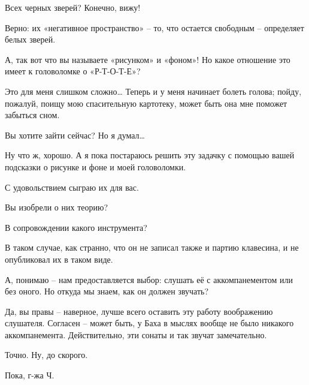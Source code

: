 \documentclass[../main.tex]{subfiles}
\begin{document}
\begin{Dialogue}
 Всех черных зверей? Конечно, вижу!

 Верно: их «негативное пространство» \--- то, что остается свободным \--- определяет белых зверей.

 А, так вот что вы называете «рисунком» и «фоном»! Но какое отношение это имеет к головоломке о «Р-Т-О-Т-Е»?

 Это для меня слишком сложно\ldots{} Теперь и у меня начинает болеть голова; пойду, пожалуй, поищу мою спасительную картотеку, может быть она мне поможет забыться сном.

 Вы хотите зайти сейчас? Но я думал\ldots{}

 Ну что ж, хорошо. А я пока постараюсь решить эту задачку с помощью вашей подсказки о рисунке и фоне и моей головоломки.

 С удовольствием сыграю их для вас.

 Вы изобрели о них теорию?

 В сопровождении какого инструмента?

 В таком случае, как странно, что он не записал также и партию клавесина, и не опубликовал их в таком виде.

 А, понимаю \--- нам предоставляется выбор: слушать её с аккомпанементом или без оного. Но откуда мы знаем, как он должен звучать?

 Да, вы правы \--- наверное, лучше всего оставить эту работу воображению слушателя. Согласен \--- может быть, у Баха в мыслях вообще не было никакого аккомпанемента. Действительно, эти сонаты и так звучат замечательно.

 Точно. Ну, до скорого.

 Пока, г-жа Ч.

\end{Dialogue}
\end{document}
